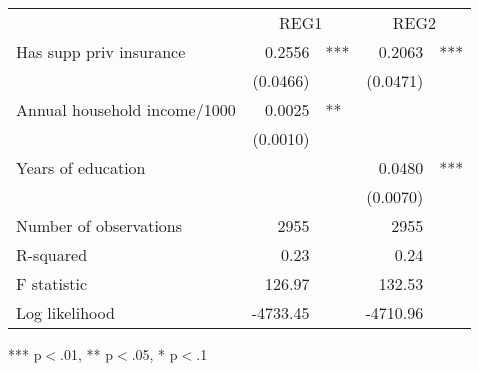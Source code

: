 \documentclass{article}
\begin{document}
\begin{table}[!h]
\centering
\begin{tabular}{lllll}
\cline{1-5}
\multicolumn{1}{r}{} &
  \multicolumn{2}{c}{REG1} &
  \multicolumn{2}{c}{REG2} \\
\cline{1-5}
\multicolumn{1}{l}{Has supp priv insurance} &
  \multicolumn{1}{r}{0.2556} &
  \multicolumn{1}{l}{***} &
  \multicolumn{1}{r}{0.2063} &
  \multicolumn{1}{l}{***} \\
\multicolumn{1}{l}{} &
  \multicolumn{1}{r}{(0.0466)} &
  \multicolumn{1}{l}{} &
  \multicolumn{1}{r}{(0.0471)} &
  \multicolumn{1}{l}{} \\
\multicolumn{1}{l}{Annual household income/1000} &
  \multicolumn{1}{r}{0.0025} &
  \multicolumn{1}{l}{**} &
  \multicolumn{1}{r}{} &
  \multicolumn{1}{l}{} \\
\multicolumn{1}{l}{} &
  \multicolumn{1}{r}{(0.0010)} &
  \multicolumn{1}{l}{} &
  \multicolumn{1}{r}{} &
  \multicolumn{1}{l}{} \\
\multicolumn{1}{l}{Years of education} &
  \multicolumn{1}{r}{} &
  \multicolumn{1}{l}{} &
  \multicolumn{1}{r}{0.0480} &
  \multicolumn{1}{l}{***} \\
\multicolumn{1}{l}{} &
  \multicolumn{1}{r}{} &
  \multicolumn{1}{l}{} &
  \multicolumn{1}{r}{(0.0070)} &
  \multicolumn{1}{l}{} \\
\multicolumn{1}{l}{Number of observations} &
  \multicolumn{1}{r}{2955} &
  \multicolumn{1}{l}{} &
  \multicolumn{1}{r}{2955} &
  \multicolumn{1}{l}{} \\
\multicolumn{1}{l}{R-squared} &
  \multicolumn{1}{r}{0.23} &
  \multicolumn{1}{l}{} &
  \multicolumn{1}{r}{0.24} &
  \multicolumn{1}{l}{} \\
\multicolumn{1}{l}{F statistic} &
  \multicolumn{1}{r}{126.97} &
  \multicolumn{1}{l}{} &
  \multicolumn{1}{r}{132.53} &
  \multicolumn{1}{l}{} \\
\multicolumn{1}{l}{Log likelihood} &
  \multicolumn{1}{r}{-4733.45} &
  \multicolumn{1}{l}{} &
  \multicolumn{1}{r}{-4710.96} &
  \multicolumn{1}{l}{} \\
\cline{1-5}
\end{tabular}

\footnotesize{
*** p$<$.01, ** p$<$.05, * p$<$.1
}
\end{table}
\end{document}
